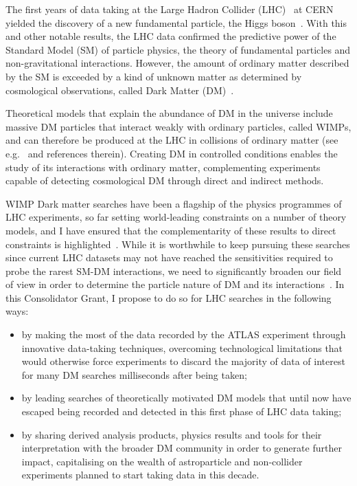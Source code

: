 \documentclass[11pt,a4paper]{article}
\begin{document}
The first years of data taking at the Large Hadron Collider (LHC)~\cite{LHC2008} at CERN yielded the discovery of a new fundamental particle, the Higgs boson~\cite{Khachatryan:2016vau}. With this and other notable results, the LHC data confirmed the predictive power of the Standard Model (SM) of particle physics, the theory of fundamental particles and non-gravitational interactions. However, the amount of ordinary matter described by the SM is exceeded by a kind of unknown matter as determined by cosmological observations, called Dark Matter (DM)~\cite{Bertone:2016nfn}. 


Theoretical models that explain the abundance of DM in the universe include massive DM particles that interact weakly with ordinary particles, called WIMPs, and can therefore be produced at the LHC in collisions of ordinary matter (see e.g.~\cite{Boveia:2018yeb} and references therein). 
Creating DM in controlled conditions enables the study of its interactions with ordinary matter, complementing experiments capable of detecting cosmological DM  through direct and indirect methods. %

WIMP Dark matter searches have been a flagship of the physics programmes of LHC experiments, so far setting world-leading constraints on a number of theory models, and I have ensured that the complementarity of these results to direct constraints is highlighted~\cite{DMWG}. While it is worthwhile to keep pursuing these searches since current LHC datasets may not have reached the sensitivities required to probe the rarest SM-DM interactions, we need to significantly broaden our field of view in order to determine the particle nature of DM and its interactions~\cite{Bertone:2018xtm}. In this Consolidator Grant, I propose to do so for LHC searches in the following ways:

\begin{itemize}
	\item by making the most of the data recorded by the ATLAS experiment through innovative data-taking techniques, overcoming technological limitations that would otherwise force experiments to discard the majority of data of interest for many DM searches milliseconds after being taken;
	\item by leading searches of theoretically motivated DM models that until now have escaped being recorded and detected in this first phase of LHC data taking;
	\item by sharing derived analysis products, physics results and tools for their interpretation with the broader DM community in order to generate further impact, capitalising on the wealth of astroparticle and non-collider experiments planned to start taking data in this decade. 
\end{itemize}
\end{document}
